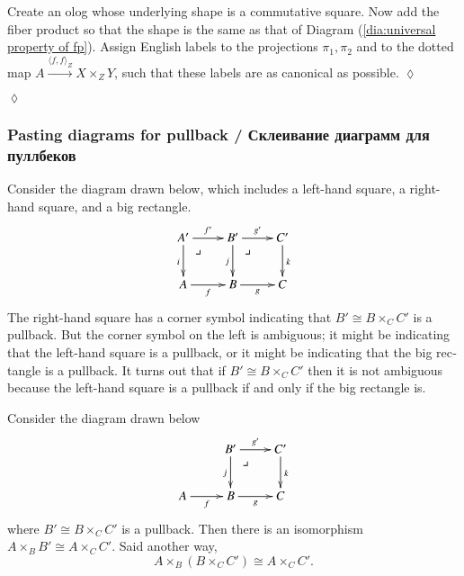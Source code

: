 \documentclass[a4paper]{book}
\makeatletter
\def\iso{\cong}
\def\la{\langle}
\def\ra{\rangle}
\def\ullimit{\ar@{}[rd]|(.3)*+{\lrcorner}}
\newcommand{\To}[1]{\xrightarrow{#1}}
\newcommand{\prodmap}[2]{\la#1,#2\ra}
\newcommand{\pb}[3]{\prodmap{#1}{#1}_{#3}}
\theoremstyle{myth}
\newtheorem{propositionENG}[envENG]{\begin{english}Proposition\end{english}}
\newtheorem{excENG}[envENG]{\begin{english}Exercise\end{english}}
\newenvironment{exerciseENG}{\begin{excENG}}{\hspace*{\fill}$\lozenge$\end{excENG}}
\newtheorem{lemmaRUS}[envRUS]{\begin{russian}Лемма\end{russian}}
\newtheorem{excRUS}[envRUS]{\begin{russian}Упражнение\end{russian}}
\newenvironment{exerciseRUS}{\begin{excRUS}}{\hspace*{\fill}$\lozenge$\end{excRUS}}
\makeatother
\begin{document}
\begin{english}
\begin{lemmaRUS}\label{lemma:up for fp}
\begin{russian} \end{russian}
\end{lemmaRUS}

\begin{exerciseENG}
Create an olog whose underlying shape is a commutative square. Now add the fiber product so that the shape is the same as that of Diagram (\ref{dia:universal property of fp}). Assign English labels to the projections $\pi_1,\pi_2$ and to the dotted map $A\To{\pb{f}{g}{Z}}X\times_ZY$, such that these labels are as canonical as possible.
\end{exerciseENG}

\begin{exerciseRUS}
\begin{russian} \end{russian}
\end{exerciseRUS}


\subsubsection{Pasting diagrams for pullback / Склеивание диаграмм для пуллбеков}

Consider the diagram drawn below, which includes a left-hand square, a right-hand square, and a big rectangle.
$$
\xymatrix{
A'\ar[r]^{f'}\ar[d]_i\ullimit&B'\ar[r]^{g'}\ar[d]_j\ullimit&C'\ar[d]^k\\
A\ar[r]_f&B\ar[r]_g&C}
$$
The right-hand square has a corner symbol indicating that $B'\iso B\times_CC'$ is a pullback. But the corner symbol on the left is ambiguous; it might be indicating that the left-hand square is a pullback, or it might be indicating that the big rectangle is a pullback. It turns out that if $B'\iso B\times_CC'$ then it is not ambiguous because the left-hand square is a pullback if and only if the big rectangle is.

\begin{russian} \end{russian}

\begin{propositionENG}\label{prop:pasting}
Consider the diagram drawn below
$$
\xymatrix{
&B'\ar[r]^{g'}\ar[d]_j\ullimit&C'\ar[d]^k\\
A\ar[r]_f&B\ar[r]_g&C}
$$
where $B'\iso B\times_CC'$ is a pullback. Then there is an isomorphism $A\times_BB'\iso A\times_CC'$. Said another way, $$A\times_B(B\times_CC')\iso A\times_CC'.$$
\end{propositionENG}


\end{english}
\end{document}
